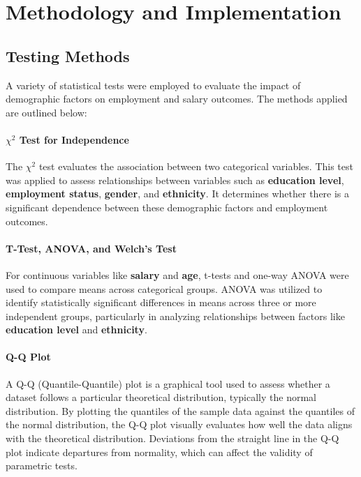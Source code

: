 \section{Methodology and Implementation}

\subsection{Testing Methods}

A variety of statistical tests were employed to evaluate the impact of demographic factors on employment and salary outcomes. The methods applied are outlined below:

\paragraph{$\chi^2$ Test for Independence}
The $\chi^2$ test evaluates the association between two categorical variables. This test was applied to assess relationships between variables such as \textbf{education level}, \textbf{employment status}, \textbf{gender}, and \textbf{ethnicity}. It determines whether there is a significant dependence between these demographic factors and employment outcomes.

\paragraph{T-Test, ANOVA, and Welch’s Test}
For continuous variables like \textbf{salary} and \textbf{age}, t-tests and one-way ANOVA were used to compare means across categorical groups. ANOVA was utilized to identify statistically significant differences in means across three or more independent groups, particularly in analyzing relationships between factors like \textbf{education level} and \textbf{ethnicity}.

\paragraph{Q-Q Plot}
A Q-Q (Quantile-Quantile) plot is a graphical tool used to assess whether a dataset follows a particular theoretical distribution, typically the normal distribution. By plotting the quantiles of the sample data against the quantiles of the normal distribution, the Q-Q plot visually evaluates how well the data aligns with the theoretical distribution. Deviations from the straight line in the Q-Q plot indicate departures from normality, which can affect the validity of parametric tests.


